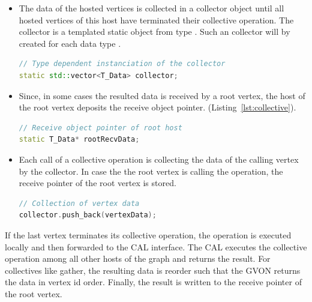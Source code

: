 \begin{itemize}
\item []
  The data of the hosted vertices is collected in a collector object
  until all hosted vertices of this host have terminated their
  collective operation.  The collector is a templated static object
  from type . Such an collector will
  by created for each data type .
  \begin{lstlisting}[language=C++, label=lst:static_collective]
// Type dependent instanciation of the collector
static std::vector<T_Data> collector;
  \end{lstlisting}

\item [] Since, in some cases the resulted data is received by a root vertex, the host of
the root vertex deposits the receive object pointer.
(Listing~\ref{lst:collective}).

\begin{lstlisting}[language=C++, label=lst:root]
// Receive object pointer of root host
static T_Data* rootRecvData;

\end{lstlisting}

\item [] Each call of a collective operation is collecting the data of the
  calling vertex by the collector.  In
  case the the root vertex is calling the operation, the receive pointer
  of the root vertex is stored.
  \begin{lstlisting}[language=C++, label=lst:collecting]
// Collection of vertex data
collector.push_back(vertexData);
  \end{lstlisting}

\end{itemize}


\noindent If the last vertex terminates its collective operation, the
operation is executed locally and then forwarded to the CAL
interface. The CAL executes the collective operation among all
other hosts of the graph and returns the result. For collectives like
gather, the resulting data is reorder such that the GVON returns the
data in vertex id order. Finally, the result is written to the receive
pointer of the root vertex.


